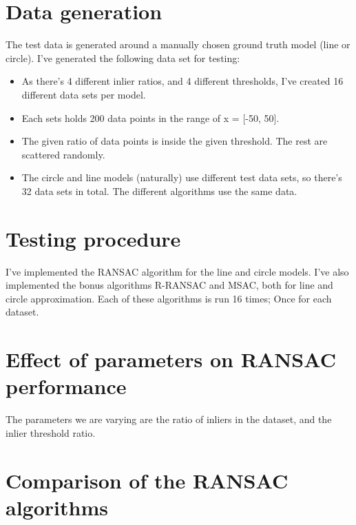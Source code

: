 \section{Data generation}

The test data is generated around a manually chosen ground truth model (line or circle).
I've generated the following data set for testing:
\begin{itemize}
  \item As there's 4 different inlier ratios, and 4 different thresholds, I've
    created 16 different data sets per model.
  \item Each sets holds 200 data points in the range of x = [-50, 50].
  \item The given ratio of data points is inside the given threshold. The rest
    are scattered randomly.
  \item The circle and line models (naturally) use different test data sets, so
    there's 32 data sets in total. The different algorithms use the same data.
\end{itemize}

\section{Testing procedure}

I've implemented the RANSAC algorithm for the line and circle models. I've also
implemented the bonus algorithms R-RANSAC and MSAC, both for line and circle
approximation. Each of these algorithms is run 16 times; Once for each dataset.

\section{Effect of parameters on RANSAC performance}

The parameters we are varying are the ratio of inliers in the dataset, and the
inlier threshold ratio.

\section{Comparison of the RANSAC algorithms}
